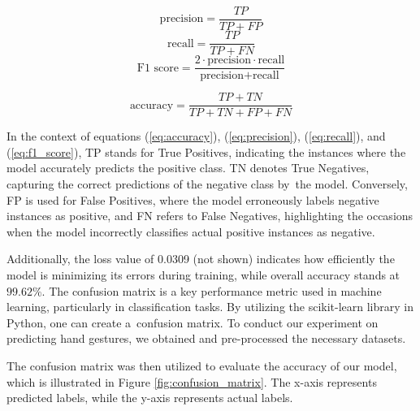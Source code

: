 \begin{equation}
	\text{precision} = \frac{TP}{TP + FP}
	\label{eq:precision}
\end{equation}
\begin{equation}
	\text{recall} = \frac{TP}{TP + FN}
	\label{eq:recall}
\end{equation}
\begin{equation}
	\text{F1 score} = \frac{2 \cdot \text{precision} \cdot \text{recall}}{\text{precision} + \text{recall}}
	\label{eq:f1_score}
\end{equation}

\begin{equation}
	\text{accuracy} = \frac{TP + TN}{TP + TN + FP + FN}
	\label{eq:accuracy}
\end{equation}

In the context of equations (\ref{eq:accuracy}), (\ref{eq:precision}), (\ref{eq:recall}), and (\ref{eq:f1_score}), TP stands for True Positives, indicating the instances where the model accurately predicts the positive class. TN denotes True Negatives, capturing the correct predictions of the negative class by~the model. Conversely, FP is used for False Positives, where the model erroneously labels negative instances as positive, and FN refers to False Negatives, highlighting the occasions when the model incorrectly classifies actual positive instances as negative.

Additionally, the loss value of 0.0309 (not shown) indicates how efficiently the model is minimizing its errors during training, while overall accuracy stands at $99.62\%$. 
The confusion matrix is a key performance metric used in machine learning, particularly in classification tasks. By utilizing the scikit-learn library in Python, one can create a~confusion matrix. To conduct our experiment on predicting hand gestures, we obtained and pre-processed the necessary datasets.

The confusion matrix was then utilized to evaluate the accuracy of our model, which is illustrated in Figure \ref{fig:confusion_matrix}. The x-axis represents predicted labels, while the y-axis represents actual labels. 

